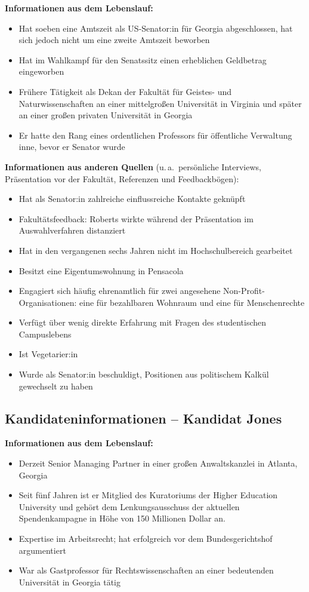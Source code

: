\textbf{Informationen aus dem Lebenslauf:}
\begin{itemize}
  \item Hat soeben eine Amtszeit als US-Senator:in für Georgia abgeschlossen, hat sich jedoch nicht um
    eine zweite Amtszeit beworben
  \item Hat im Wahlkampf für den Senatssitz einen erheblichen Geldbetrag eingeworben
  \item Frühere Tätigkeit als Dekan der Fakultät für Geistes- und Naturwissenschaften an einer mittelgroßen
    Universität in Virginia und später an einer großen privaten Universität in Georgia
  \item Er hatte den Rang eines ordentlichen Professors für öffentliche Verwaltung inne, bevor er Senator wurde
\end{itemize}

\textbf{Informationen aus anderen Quellen}
(u.\,a.\ persönliche Interviews, Präsentation vor der Fakultät, Referenzen und Feedbackbögen):
\begin{itemize}
  \item Hat als Senator:in zahlreiche einflussreiche Kontakte geknüpft
  \item Fakultätsfeedback: Roberts wirkte während der Präsentation im Auswahlverfahren distanziert
  \item Hat in den vergangenen sechs Jahren nicht im Hochschulbereich gearbeitet
  \item Besitzt eine Eigentumswohnung in Pensacola
  \item Engagiert sich häufig ehrenamtlich für zwei angesehene Non-Profit-Organisationen: eine für
    bezahlbaren Wohnraum und eine für Menschenrechte
  \item Verfügt über wenig direkte Erfahrung mit Fragen des studentischen Campuslebens
  \item Ist Vegetarier:in
  \item Wurde als Senator:in beschuldigt, Positionen aus politischem Kalkül gewechselt zu haben
\end{itemize}

\clearpage
\subsection*{Kandidateninformationen -- Kandidat Jones}
\thispagestyle{empty}

\textbf{Informationen aus dem Lebenslauf:}
\begin{itemize}
  \item Derzeit Senior Managing Partner in einer großen Anwaltskanzlei in Atlanta, Georgia
  \item Seit fünf Jahren ist er Mitglied des Kuratoriums der Higher Education University und gehört dem
    Lenkungsausschuss der aktuellen Spendenkampagne in Höhe von 150 Millionen Dollar an.
  \item Expertise im Arbeitsrecht; hat erfolgreich vor dem Bundesgerichtshof argumentiert
  \item War als Gastprofessor für Rechtswissenschaften an einer bedeutenden Universität in Georgia tätig
\end{itemize}

